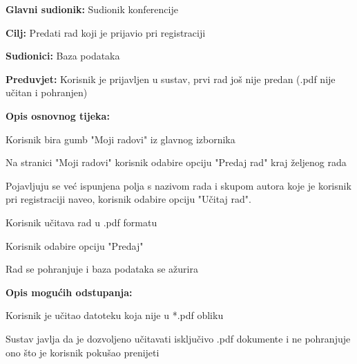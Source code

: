 				
					\noindent {}
					\begin{packed_item}
	
						\item \textbf{Glavni sudionik: } Sudionik konferencije
						\item  \textbf{Cilj:} Predati rad koji je prijavio pri registraciji
						\item  \textbf{Sudionici:} Baza podataka
						\item  \textbf{Preduvjet:} Korisnik je prijavljen u sustav, prvi rad još nije predan (.pdf nije učitan i pohranjen)
						\item  \textbf{Opis osnovnog tijeka:}
						
						\item[] \begin{packed_enum}

							\item Korisnik bira gumb "Moji radovi" iz glavnog izbornika
							\item Na stranici "Moji radovi" korisnik odabire opciju "Predaj rad" kraj željenog rada
							\item Pojavljuju se već ispunjena polja s nazivom rada i skupom autora koje je korisnik pri registraciji naveo, korisnik odabire opciju "Učitaj rad".
							\item Korisnik učitava rad u .pdf formatu
							\item Korisnik odabire opciju "Predaj"
							\item Rad se pohranjuje i baza podataka se ažurira

					
						\end{packed_enum}

						\item  \textbf{Opis mogućih odstupanja:}
						
						\item[] \begin{packed_item}
	
							\item[4.a]  Korisnik je učitao datoteku koja nije u *.pdf obliku
							\item[] \begin{packed_enum}
								
								\item Sustav javlja da je dozvoljeno učitavati isključivo .pdf dokumente i ne pohranjuje ono što je korisnik pokušao prenijeti
								
							\end{packed_enum}


\end{packed_item}
\end{packed_item}

